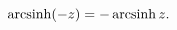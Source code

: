 \[\mathop{\mathrm{arcsinh}\/}\nolimits\!\left(-z\right)=-\mathop{\mathrm{arcsinh%
}\/}\nolimits z.\]